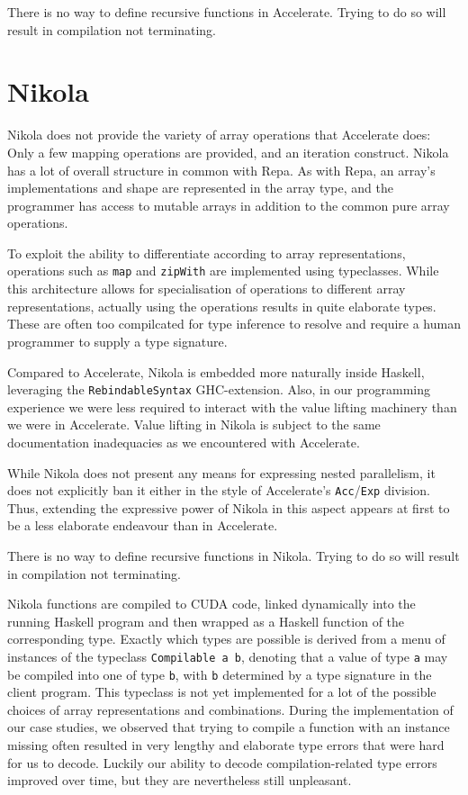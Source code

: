 There is no way to define recursive functions in Accelerate. Trying to do so
will result in compilation not terminating.

\section{Nikola}
\label{sec:language-discussion-nikola}

Nikola does not provide the variety of array operations that Accelerate does: Only
a few mapping operations are provided, and an iteration construct.  Nikola has
a lot of overall structure in common with Repa. As with Repa, an array's
implementations and shape are represented in the array type, and the programmer
has access to mutable arrays in addition to the common pure array operations.

To exploit the ability to differentiate according to array representations,
operations such as \texttt{map} and \texttt{zipWith} are implemented using
typeclasses.  While this architecture allows for specialisation of operations
to different array representations, actually using the operations results in quite
elaborate types. These are often too compilcated for type inference to resolve
and require a human programmer to supply a type signature.

Compared to Accelerate, Nikola is embedded more naturally inside Haskell,
leveraging the \texttt{RebindableSyntax} GHC-extension. Also, in our programming
experience we were less required to interact with the value lifting machinery
than we were in Accelerate. Value lifting in Nikola is subject to the same
documentation inadequacies as we encountered with Accelerate.

While Nikola does not present any means for expressing nested parallelism, it
does not explicitly ban it either in the style of Accelerate's
\texttt{Acc}/\texttt{Exp} division. Thus, extending the expressive power of
Nikola in this aspect appears at first to be a less elaborate endeavour than in
Accelerate.

There is no way to define recursive functions in Nikola. Trying to do so
will result in compilation not terminating.

Nikola functions are compiled to CUDA code, linked dynamically into
the running Haskell program and then wrapped as a Haskell function of
the corresponding type.  Exactly which types are possible is derived
from a menu of instances of the typeclass \texttt{Compilable a b},
denoting that a value of type \texttt{a} may be compiled into one of
type \texttt{b}, with \texttt{b} determined by a type signature in the
client program. This typeclass is not yet implemented for a lot of the
possible choices of array representations and combinations. During the
implementation of our case studies, we observed that trying to compile
a function with an instance missing often resulted in very lengthy and
elaborate type errors that were hard for us to decode. Luckily our
ability to decode compilation-related type errors improved over time,
but they are nevertheless still unpleasant.

